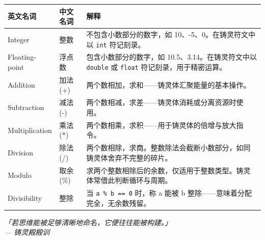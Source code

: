 \documentclass[UTF8,a4paper,12pt]{ctexart}
\begin{document}
\begin{center}
\begin{tabular}{|l|l|p{10cm}|}
\hline
\textbf{英文名词} & \textbf{中文名词} & \textbf{解释} \\
\hline
Integer & 整数 & 不包含小数部分的数字，如 10、-5、0。在铸灵符文中以 \texttt{int} 符记刻录。 \\
\hline
Floating-point & 浮点数 & 包含小数部分的数字，如 10.5、3.14。在铸灵符文中以 \texttt{double} 或 \texttt{float} 符记刻录，用于精密运算。 \\
\hline
Addition & 加法 (+) & 两个数相加，求和——铸灵体汇聚能量的基本操作。 \\
\hline
Subtraction & 减法 (-) & 两个数相减，求差——铸灵体消耗或分离资源时使用。 \\
\hline
Multiplication & 乘法 (*) & 两个数相乘，求积——用于铸灵体的倍增与放大指令。 \\
\hline
Division & 除法 (/) & 两个数相除，求商。整数除法会截断小数部分，如同铸灵体舍弃不完整的碎片。 \\
\hline
Modulo & 取余 (\%) & 求两个整数相除后的余数，仅适用于整数类型。铸灵体常借此判断循环与周期。 \\
\hline
Divisibility & 整除 & 当 \texttt{a \% b == 0} 时，称 a 能被 b 整除——意味着分配完全，无余数残留。 \\
\hline
\end{tabular}
\end{center}

\vfill
\begin{center}
\textit{「若思维能被足够清晰地命名，它便往往能被构建。」\\
--- 铸灵殿殿训}
\end{center}
\end{document}
